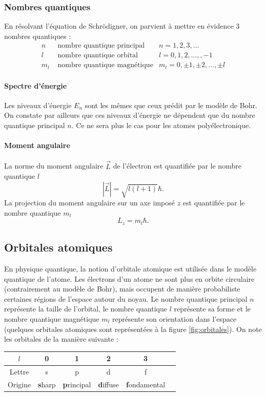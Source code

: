 \subsubsection{Nombres quantiques}
En résolvant l'équation de Schrödigner, on parvient à mettre en 
évidence 3 nombres quantiques :
\begin{align*}
	n 	&	\text{ nombre quantique principal} 	& n = 1,2,3,\dots \\
	l 	& \text{ nombre quantique orbital} 		& l = 0,1,2,\dots,,-1 \\
	m_l &	\text{ nombre quantique magnétique}	& m_l = 0,\pm 1,\pm 2,\dots,\pm l
\end{align*}

\paragraph{Spectre d'énergie}
Les niveaux d'énergie $E_n$ sont les mêmes que ceux
prédit par le modèle de Bohr. On constate par ailleurs
que ces niveaux d'énergie ne dépendent que du nombre
quantique principal $n$. Ce ne sera plus le cas
pour les atomes polyélectronique.
\paragraph{Moment angulaire}
La norme du moment angulaire $\vec{L}$ de l'électron est quantifiée
par le nombre quantique $l$
\[ |\vec{L}| = \sqrt{l(l+1)}\hbar. \]
La projection du moment angulaire sur un axe imposé $z$
est quantifiée par le nombre quantique $m_l$
\[ L_z = m_l\hbar. \]

\subsection{Orbitales atomiques}
En physique quantique, la notion d'orbitale atomique
est utilisée dans le modèle quantique de l'atome. 
Les électrons d'un atome ne sont plus en orbite circulaire
(contrairement au modèle de Bohr), mais occupent
de manière probabiliste certaines régions de l'espace
autour du noyau. Le nombre quantique principal
$n$ représente la taille de l'orbital, le nombre
quantique $l$ représente sa forme et le nombre
quantique magnétique $m_l$ représente son orientation
dans l'espace (quelques orbitales
atomiques sont représentées à la figure 
\ref{fig:orbitales}). On note les orbitales de
la manière suivante :

\begin{center}
  \begin{tabular}{c|ccccc}
    $l$ 		& 0 & 1 & 2 & 3 \\
    \hline
    Lettre 	& s & p & d & f \\
    Origine & {\bf s}harp & {\bf p}rincipal & {\bf d}iffuse & {\bf f}ondamental
  \end{tabular}
\end{center}

